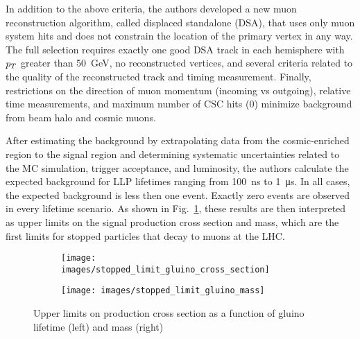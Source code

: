 \documentclass[12pt]{article}
\begin{document}
        In addition to the above criteria, the authors developed a new muon reconstruction algorithm, called displaced standalone (DSA), that uses only muon system hits and does not constrain the location of the primary vertex in any way. The full selection requires exactly one good DSA track in each hemisphere with $p_T$ greater than \SI{50}{\giga\electronvolt}, no reconstructed vertices, and several criteria related to the quality of the reconstructed track and timing measurement. Finally, restrictions on the direction of muon momentum (incoming vs outgoing), relative time measurements, and maximum number of CSC hits (0) minimize background from beam halo and cosmic muons.

        After estimating the background by extrapolating data from the cosmic-enriched region to the signal region and determining systematic uncertainties related to the MC simulation, trigger acceptance, and luminosity, the authors calculate the expected background for LLP lifetimes ranging from \SI{100}{\nano\s} to \SI{1}{\micro\s}. In all cases, the expected background is less then one event. Exactly zero events are observed in every lifetime scenario. As shown in Fig.~\ref{stopped_limits}, these results are then interpreted as upper limits on the signal production cross section and mass, which are the first limits for stopped particles that decay to muons at the LHC.

        \noindent \begin{figure}[htbp] \begin{center}
        \begin{subfigure}[htbp]{0.5\textwidth} \begin{center}
        \texttt{[image: images/stopped\_limit\_gluino\_cross\_section]}
        \end{center} \end{subfigure}
        \begin{subfigure}[htbp]{0.45\textwidth} \begin{center}
        \texttt{[image: images/stopped\_limit\_gluino\_mass]}
        \end{center} \end{subfigure}
            \caption{Upper limits on production cross section as a function of gluino lifetime (left) and mass (right)~\cite{cms_stopped}}
        \label{stopped_limits}
        \end{center} \end{figure}
\end{document}
